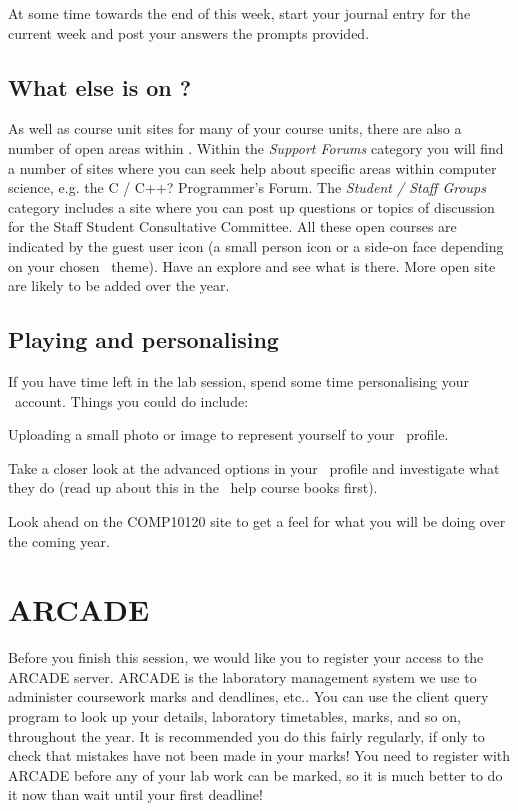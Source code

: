At some time towards the end of this week, start your journal entry for the current week and post your answers the prompts provided.

\subsection{What else is on \moodle?}
\label{sec:what-else-moodle}


As well as course unit sites for many of your course units, there are also a number of open areas within \moodle. Within the \emph{Support Forums} category you will find a number of sites where you can seek help about specific areas within computer science, e.g. the C / C++? Programmer's Forum. The \emph{Student / Staff Groups} category includes a site where you can post up questions or topics of discussion for the Staff Student Consultative Committee. All these open courses are indicated by the guest user icon (a small person icon or a side-on face depending on your chosen \moodle\ theme). Have an explore and see what is there. More open site are likely to be added over the year.

\subsection*{Playing and personalising}
\label{sec:play-pers}


If you have time left in the lab session, spend some time personalising your \moodle\ account. Things you could do include:

Uploading a small photo or image to represent yourself to your \moodle\ profile.


Take a closer look at the advanced options in your \moodle\ profile and investigate what they do (read up about this in the \moodle\ help course books first).


 Look ahead on the COMP10120 site to get a feel for what you will be doing over the coming year.

 \section{ARCADE}

 Before you finish this session, we would like you to register your access to the ARCADE server. ARCADE is the laboratory management system we use to administer coursework marks and deadlines, etc.. You can use the client query program to look up your details, laboratory timetables, marks, and so on, throughout the year. It is recommended you do this fairly regularly, if only to check that mistakes have not been made in your marks! You need to register with ARCADE before any of your lab work can be marked, so it is much better to do it now than wait until your first deadline!

